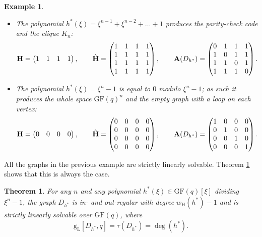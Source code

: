 \documentclass[a4paper, 11pt]{book}
\numberwithin{equation}{section}
\theoremstyle{plain}
\newtheorem{theorem}	[equation]	{Theorem}
\newtheorem{example}	[equation]	{Example}
\newcommand{\feedback}{\tau}
\newcommand{\adjacency}{{\bf A}}
\newcommand{\linear}[1]{#1_\mathrm{L}}
\newcommand{\guessing}{\mathrm{g}}
\newcommand{\linearGuessing}{\linear{\guessing}}
\newcommand{\wH}{w_\mathrm{H}}
\newcommand{\GF}{\mathrm{GF}}
\renewcommand{\(}{\ldbrack}
\renewcommand{\)}{\rdbrack}
\begin{document}
\begin{example}
\begin{itemize}
    \item The polynomial $h^*(\xi) = \xi^{n-1} + \xi^{n-2} + \dots + 1$ produces the parity-check code and the clique $K_n$:
	\[
		{\bf H} = \begin{pmatrix}
		1 & 1 & 1 & 1
		\end{pmatrix}, \qquad
		\hat{\bf H} = \begin{pmatrix}
		1 & 1 & 1 & 1\\
		1 & 1 & 1 & 1\\
		1 & 1 & 1 & 1\\
		1 & 1 & 1 & 1
		\end{pmatrix}, \qquad
		\adjacency(D_{h^*}) = \begin{pmatrix}
		0 & 1 & 1 & 1\\
		1 & 0 & 1 & 1\\
		1 & 1 & 0 & 1\\
		1 & 1 & 1 & 0
		\end{pmatrix}.
	\]
	
	
	\item The polynomial $h^*(\xi) = \xi^n - 1$ is equal to $0$ modulo $\xi^n-1$; as such it produces the whole space $\GF(q)^n$ and the empty graph with a loop on each vertex:
	\[
		{\bf H} = \begin{pmatrix}
		0 & 0 & 0 & 0
		\end{pmatrix}, \qquad
		\hat{\bf H} = \begin{pmatrix}
		0 & 0 & 0 & 0\\
		0 & 0 & 0 & 0\\
		0 & 0 & 0 & 0\\
		0 & 0 & 0 & 0
		\end{pmatrix}, \qquad
		\adjacency(D_{h^*}) = \begin{pmatrix}
		1 & 0 & 0 & 0\\
		0 & 1 & 0 & 0\\
		0 & 0 & 1 & 0\\
		0 & 0 & 0 & 1
		\end{pmatrix}.
	\]
\end{itemize}
\end{example}

All the graphs in the previous example are strictly linearly solvable. Theorem \ref{th:graph_produced_by_code} shows that this is always the case.


\begin{theorem} \label{th:graph_produced_by_code}
For any $n$ and any polynomial $h^*(\xi) \in \GF(q)[\xi]$ dividing $\xi^n - 1$, the graph $D_{h^*}$ is in- and out-regular with degree $\wH(h^*) - 1$ and is strictly linearly solvable over $\GF(q)$, where
\[
	\linearGuessing[D_{h^*}, q] = \feedback(D_{h^*}) = \deg(h^*).
\]
\end{theorem}
\end{document}
